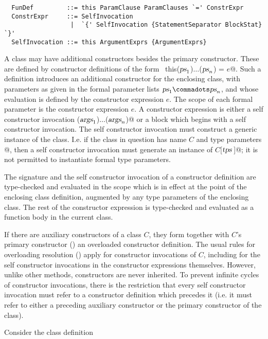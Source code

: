 \syntax\begin{lstlisting}
  FunDef         ::= this ParamClause ParamClauses `=' ConstrExpr
  ConstrExpr     ::= SelfInvocation
                  |  `{' SelfInvocation {StatementSeparator BlockStat} `}'
  SelfInvocation ::= this ArgumentExprs {ArgumentExprs}
\end{lstlisting}

A class may have additional constructors besides the primary
constructor.  These are defined by constructor definitions of the form
~\lstinline@def this($\mbox{\sl ps}_1$)$\ldots$($\mbox{\sl ps}_n$) = $e$@.  Such a
definition introduces an additional constructor for the enclosing
class, with parameters as given in the formal parameter lists $\ps_1
\commadots \ps_n$, and whose evaluation is defined by the constructor
expression $e$.  The scope of each formal parameter is the constructor
expression $e$.  A constructor expression is either a self constructor
invocation \lstinline@this($\mbox{\sl args}_1$)$\ldots$($\mbox{\sl args}_n$)@ or a block
which begins with a self constructor invocation. The self constructor
invocation must construct a generic instance of the class. I.e. if the
class in question has name $C$ and type parameters
\lstinline@[$\tps\,$]@, then a self constructor invocation must
generate an instance of \lstinline@$C$[$\tps\,$]@; it is not permitted
to instantiate formal type parameters.

The signature and the self constructor invocation of a constructor
definition are type-checked and evaluated in the scope which is in
effect at the point of the enclosing class definition, augmented by
any type parameters of the enclosing class. The rest of the
constructor expression is type-checked and evaluated as a function
body in the current class.
  
If there are auxiliary constructors of a class $C$, they form together
with $C$'s primary constructor ()
an overloaded constructor
definition. The usual rules for overloading resolution
() apply for constructor invocations of $C$,
including for the self constructor invocations in the constructor
expressions themselves. However, unlike other methods, constructors
are never inherited.  To prevent infinite cycles of constructor
invocations, there is the restriction that every self constructor
invocation must refer to a constructor definition which precedes it
(i.e. it must refer to either a preceding auxiliary constructor or the
primary constructor of the class).  

\example Consider the class definition

